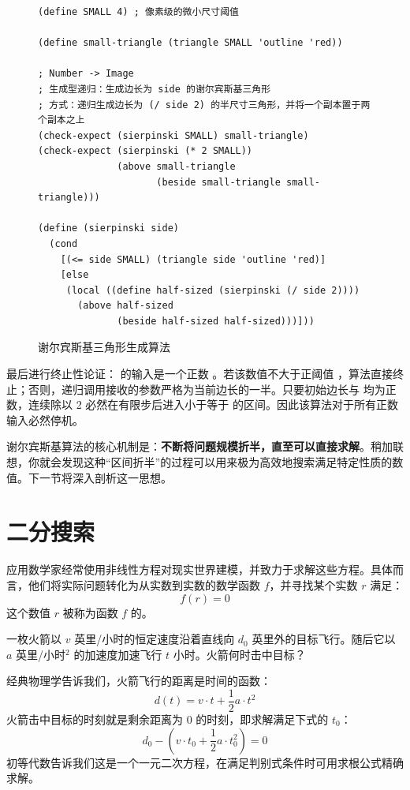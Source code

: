 \begin{figure}[htbp]
  \centering
\begin{lstlisting}[language=BSL]
(define SMALL 4) ; 像素级的微小尺寸阈值

(define small-triangle (triangle SMALL 'outline 'red))

; Number -> Image
; 生成型递归：生成边长为 side 的谢尔宾斯基三角形
; 方式：递归生成边长为 (/ side 2) 的半尺寸三角形，并将一个副本置于两个副本之上
(check-expect (sierpinski SMALL) small-triangle)
(check-expect (sierpinski (* 2 SMALL))
              (above small-triangle
                     (beside small-triangle small-triangle)))

(define (sierpinski side)
  (cond
    [(<= side SMALL) (triangle side 'outline 'red)]
    [else
     (local ((define half-sized (sierpinski (/ side 2))))
       (above half-sized
              (beside half-sized half-sized)))]))
\end{lstlisting}
  \caption{谢尔宾斯基三角形生成算法}
  \label{fig:sierpinski-code}
\end{figure}

最后进行终止性论证： 的输入是一个正数 。若该数值不大于正阈值 ，算法直接终止；否则，递归调用接收的参数严格为当前边长的一半。只要初始边长与  均为正数，连续除以 2 必然在有限步后进入小于等于  的区间。因此该算法对于所有正数输入必然停机。

谢尔宾斯基算法的核心机制是：\textbf{不断将问题规模折半，直至可以直接求解}。稍加联想，你就会发现这种“区间折半”的过程可以用来极为高效地搜索满足特定性质的数值。下一节将深入剖析这一思想。

\section{二分搜索}
\label{sec:27_2}

应用数学家经常使用非线性方程对现实世界建模，并致力于求解这些方程。具体而言，他们将实际问题转化为从实数到实数的数学函数 $f$，并寻找某个实数 $r$ 满足：
\[ f(r) = 0 \]
这个数值 $r$ 被称为函数 $f$ 的。

\begin{notebox}[物理样例问题]
一枚火箭以 $v$ 英里/小时的恒定速度沿着直线向 $d_0$ 英里外的目标飞行。随后它以 $a$ 英里/小时$^2$ 的加速度加速飞行 $t$ 小时。火箭何时击中目标？
\end{notebox}

经典物理学告诉我们，火箭飞行的距离是时间的函数：
\[ d(t) = v \cdot t + \frac{1}{2} a \cdot t^2 \]
火箭击中目标的时刻就是剩余距离为 0 的时刻，即求解满足下式的 $t_0$：
\[ d_0 - \left(v \cdot t_0 + \frac{1}{2} a \cdot t_0^2\right) = 0 \]
初等代数告诉我们这是一个一元二次方程，在满足判别式条件时可用求根公式精确求解。

